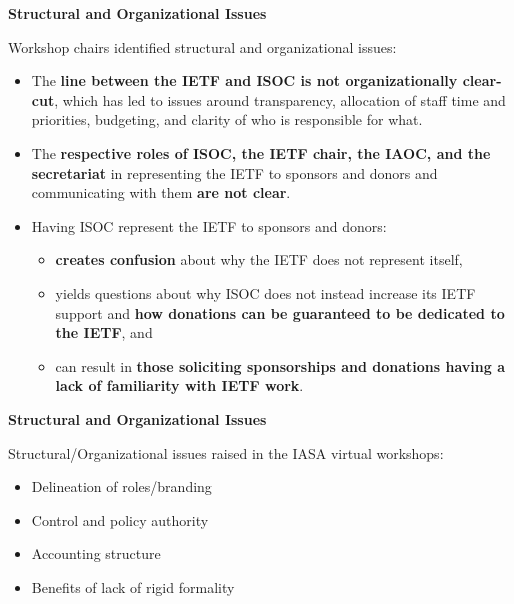 \documentclass[helvetica]{seminar}
\newcommand{\heading}[1]{%
  \begin{center} 
    \large\bf 
    #1 
  \end{center} 
  \vspace{.4 in}}
\begin{document}
\begin{slide}
\heading{Structural and Organizational Issues}

Workshop chairs identified structural and organizational issues:
{\footnotesize
\begin{itemize}
\item The \textbf{line between the IETF and ISOC is not
  organizationally clear-cut}, which has led to issues around
  transparency, allocation of staff time and priorities, budgeting,
  and clarity of who is responsible for what.
\item The \textbf{respective roles of ISOC, the IETF chair, the IAOC,
  and the secretariat} in representing the IETF to sponsors and donors
  and communicating with them \textbf{are not clear}.
\item Having ISOC represent the IETF to sponsors and donors:
  \begin{itemize}
  \item \textbf{creates confusion} about why the IETF does not
    represent itself,
  \item yields questions about why ISOC does not instead increase its
    IETF support and \textbf{how donations can be guaranteed to be
      dedicated to the IETF}, and
  \item can result in \textbf{those soliciting sponsorships and
    donations having a lack of familiarity with IETF work}.
  \end{itemize}
\end{itemize}
}

\end{slide}

\begin{slide}
\heading{Structural and Organizational Issues}

Structural/Organizational issues raised in the IASA virtual workshops:
\begin{itemize}
\item Delineation of roles/branding
\item Control and policy authority
\item Accounting structure
\item Benefits of lack of rigid formality
\end{itemize}

\end{slide}
\end{document}
